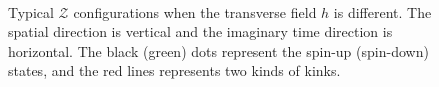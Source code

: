 \documentclass{article}
\theoremstyle{plain} \newtheorem{thm}{Theorem}[section]
\theoremstyle{definition} \newtheorem{df}{Definition}[section]
\theoremstyle{definition} \newtheorem{eg}{Example}
\theoremstyle{remark} \newtheorem*{rmk}{Remark}
\begin{document}
\begin{figure}[htpb]
  \centering
  \\
		\caption{Typical $\mathcal{Z}$ configurations when the transverse field $h$ is different. The spatial direction is vertical and the imaginary time direction is horizontal. The black (green) dots represent the spin-up (spin-down) states, and the red lines represents two kinds of kinks.}
		\label{fig:Z_configuratons}
\end{figure}
\end{document}
